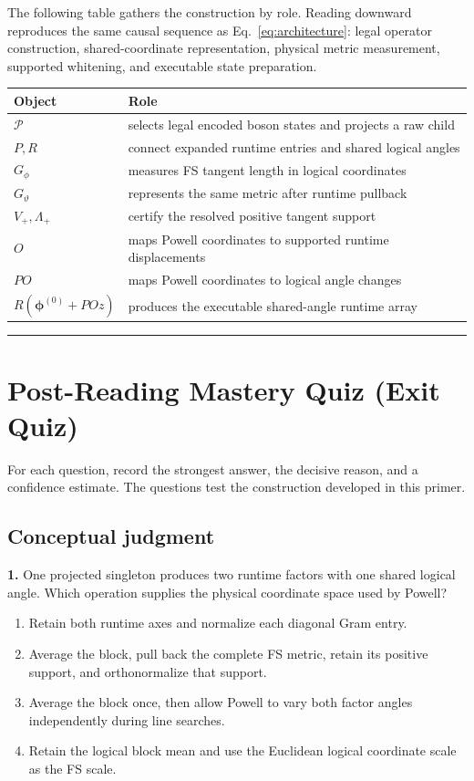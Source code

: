 \documentclass[10pt,twocolumn]{article}
\newcommand{\conceptbreak}{%
  \par\medskip\noindent
  {\color{black!30}\rule{\columnwidth}{0.35pt}}%
  \par\medskip}
\begin{document}
The following table gathers the construction by role. Reading downward
reproduces the same causal sequence as Eq.~\eqref{eq:architecture}: legal
operator construction, shared-coordinate representation, physical metric
measurement, supported whitening, and executable state preparation.

\begin{center}
\renewcommand{\arraystretch}{1.15}
\begin{tabular}{@{}p{}p{}@{}}
\toprule
Object & Role \\
\midrule
\(\mathcal P\) & selects legal encoded boson states and projects a raw child \\
\(P,R\) & connect expanded runtime entries and shared logical angles \\
\(G_\phi\) & measures FS tangent length in logical coordinates \\
\(G_\vartheta\) & represents the same metric after runtime pullback \\
\(V_+,\Lambda_+\) & certify the resolved positive tangent support \\
\(O\) & maps Powell coordinates to supported runtime displacements \\
\(PO\) & maps Powell coordinates to logical angle changes \\
\(R(\bm\phi^{(0)}+POz)\) & produces the executable shared-angle runtime array \\
\bottomrule
\end{tabular}
\end{center}

\conceptbreak

\section*{Post-Reading Mastery Quiz (Exit Quiz)}

For each question, record the strongest answer, the decisive reason, and a
confidence estimate. The questions test the construction developed in this
primer.

\subsection*{Conceptual judgment}

\textbf{1.} One projected singleton produces two runtime factors with one
shared logical angle. Which operation supplies the physical coordinate space
used by Powell?
\begin{enumerate}[label=\Alph*.,leftmargin=1.45em,itemsep=1pt,topsep=2pt]
\item Retain both runtime axes and normalize each diagonal Gram entry.
\item Average the block, pull back the complete FS metric, retain its positive
support, and orthonormalize that support.
\item Average the block once, then allow Powell to vary both factor angles
independently during line searches.
\item Retain the logical block mean and use the Euclidean logical coordinate
scale as the FS scale.
\end{enumerate}
\end{document}

